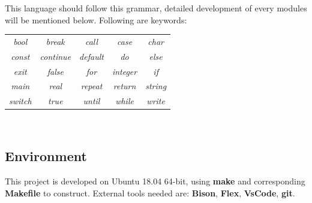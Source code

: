 \documentclass{article}
\begin{document}
		This language should follow this grammar, detailed development of every modules will be mentioned below. Following are keywords:\\
		\begin{center}
		\begin{tabular}{ccccc}
			\emph{bool} & \emph{break} & \emph{call} & \emph{case} & \emph{char} \\
			\emph{const} & \emph{continue} & \emph{default} & \emph{do} & \emph{else} \\
			\emph{exit} & \emph{false} & \emph{for} & \emph{integer} & \emph{if} \\
			\emph{main} & \emph{real} & \emph{repeat} & \emph{return} & \emph{string}\\
			\emph{switch} & \emph{true} & \emph{until} & \emph{while} & \emph{write}\\
			
		\end{tabular}\\
		\end{center}
		\subsection{Environment}
		This project is developed on Ubuntu 18.04 64-bit, using \textbf{make} and corresponding \textbf{Makefile} to construct. External tools needed are: \textbf{Bison}, \textbf{Flex}, \textbf{VsCode}, \textbf{git}.
\end{document}
